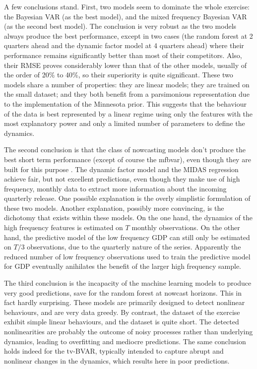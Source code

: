 A few conclusions stand. First, two models seem to dominate the whole exercise: the Bayesian VAR (as the best model), and the mixed frequency Bayesian VAR (as the second best model). The conclusion is very robust as the two models always produce the best performance, except in two cases (the random forest at 2 quarters ahead and the dynamic factor model at 4 quarters ahead) where their performance remains significantly better than most of their competitors. Also, their RMSE proves considerably lower than that of the other models, usually of the order of 20\% to 40\%, so their superiority is quite significant. These two models share a number of properties: they are linear models; they are trained on the small dataset; and they both benefit from a parsimonious representation due to the implementation of the Minnesota prior. This suggests that the behaviour of the data is best represented by a linear regime using only the features with the most explanatory power and only a limited number of parameters to define the dynamics.

The second conclusion is that the class of nowcasting models don't produce the best short term performance (except of course the mfbvar), even though they are built for this purpose . The dynamic factor model and the MIDAS regression achieve fair, but not excellent predictions, even though they make use of high frequency, monthly data to extract more information about the incoming quarterly release. One possible explanation is the overly simplistic formulation of these two models. Another explanation, possibly more convincing, is the dichotomy that exists within these models. On the one hand, the dynamics of the high frequency features is estimated on $T$ monthly observations. On the other hand, the predictive model of the low frequency GDP can still only be estimated on $T/3$ observations, due to the quarterly nature of the series. Apparently the reduced number of low frequency observations used to train the predictive model for GDP eventually anihilates the benefit of the larger high frequency sample.

The third conclusion is the incapacity of the machine learning models to produce very good predictions, save for the random forest at nowcast horizons. This in fact hardly surprising. These models are primarily designed to detect nonlinear behaviours, and are very data greedy. By contrast, the dataset of the exercise exhibit simple linear behaviours, and the dataset is quite short. The detected nonlinearities are probably the outcome of noisy processes rather than underlying dynamics, leading to overfitting and mediocre predictions. The same conclusion holds indeed for the tv-BVAR, typically intended to capture abrupt and nonlinear changes in the dynamics, which results here in poor predictions.

